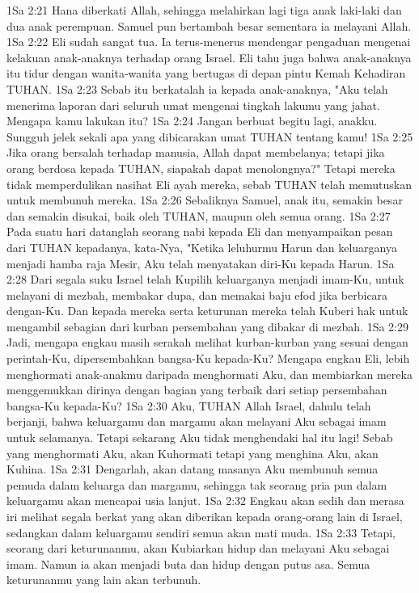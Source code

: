 1Sa 2:21  Hana diberkati Allah, sehingga melahirkan lagi tiga anak laki-laki dan dua anak perempuan. Samuel pun bertambah besar sementara ia melayani Allah.
1Sa 2:22  Eli sudah sangat tua. Ia terus-menerus mendengar pengaduan mengenai kelakuan anak-anaknya terhadap orang Israel. Eli tahu juga bahwa anak-anaknya itu tidur dengan wanita-wanita yang bertugas di depan pintu Kemah Kehadiran TUHAN.
1Sa 2:23  Sebab itu berkatalah ia kepada anak-anaknya, "Aku telah menerima laporan dari seluruh umat mengenai tingkah lakumu yang jahat. Mengapa kamu lakukan itu?
1Sa 2:24  Jangan berbuat begitu lagi, anakku. Sungguh jelek sekali apa yang dibicarakan umat TUHAN tentang kamu!
1Sa 2:25  Jika orang bersalah terhadap manusia, Allah dapat membelanya; tetapi jika orang berdosa kepada TUHAN, siapakah dapat menolongnya?" Tetapi mereka tidak memperdulikan nasihat Eli ayah mereka, sebab TUHAN telah memutuskan untuk membunuh mereka.
1Sa 2:26  Sebaliknya Samuel, anak itu, semakin besar dan semakin disukai, baik oleh TUHAN, maupun oleh semua orang.
1Sa 2:27  Pada suatu hari datanglah seorang nabi kepada Eli dan menyampaikan pesan dari TUHAN kepadanya, kata-Nya, "Ketika leluhurmu Harun dan keluarganya menjadi hamba raja Mesir, Aku telah menyatakan diri-Ku kepada Harun.
1Sa 2:28  Dari segala suku Israel telah Kupilih keluarganya menjadi imam-Ku, untuk melayani di mezbah, membakar dupa, dan memakai baju efod jika berbicara dengan-Ku. Dan kepada mereka serta keturunan mereka telah Kuberi hak untuk mengambil sebagian dari kurban persembahan yang dibakar di mezbah.
1Sa 2:29  Jadi, mengapa engkau masih serakah melihat kurban-kurban yang sesuai dengan perintah-Ku, dipersembahkan bangsa-Ku kepada-Ku? Mengapa engkau Eli, lebih menghormati anak-anakmu daripada menghormati Aku, dan membiarkan mereka menggemukkan dirinya dengan bagian yang terbaik dari setiap persembahan bangsa-Ku kepada-Ku?
1Sa 2:30  Aku, TUHAN Allah Israel, dahulu telah berjanji, bahwa keluargamu dan margamu akan melayani Aku sebagai imam untuk selamanya. Tetapi sekarang Aku tidak menghendaki hal itu lagi! Sebab yang menghormati Aku, akan Kuhormati tetapi yang menghina Aku, akan Kuhina.
1Sa 2:31  Dengarlah, akan datang masanya Aku membunuh semua pemuda dalam keluarga dan margamu, sehingga tak seorang pria pun dalam keluargamu akan mencapai usia lanjut.
1Sa 2:32  Engkau akan sedih dan merasa iri melihat segala berkat yang akan diberikan kepada orang-orang lain di Israel, sedangkan dalam keluargamu sendiri semua akan mati muda.
1Sa 2:33  Tetapi, seorang dari keturunanmu, akan Kubiarkan hidup dan melayani Aku sebagai imam. Namun ia akan menjadi buta dan hidup dengan putus asa. Semua keturunanmu yang lain akan terbunuh.
